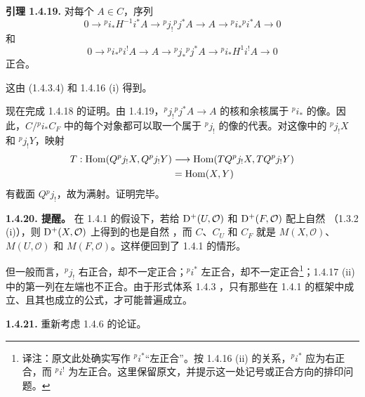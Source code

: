 \par\medskip\noindent\textbf{引理 1.4.19.}
对每个 $A\in C$，序列
\[
0\longrightarrow{}^pi_*H^{-1}i^*A\longrightarrow{}^pj_!{}^pj^*A
 \longrightarrow A\longrightarrow{}^pi_*{}^pi^*A\longrightarrow0
\]
和
\[
0\longrightarrow{}^pi_*{}^pi^!A\longrightarrow A
 \longrightarrow{}^pj_*{}^pj^*A\longrightarrow{}^pi_*H^1i^!A\longrightarrow0
\]
正合。

这由 (1.4.3.4) 和 1.4.16 (i) 得到。

现在完成 1.4.18 的证明。由 1.4.19，${}^pj_!{}^pj^*A\to A$ 的核和余核属于 ${}^pi_*$ 的像。因此，$C/{}^pi_*C_F$ 中的每个对象都可以取一个属于 ${}^pj_!$ 的像的代表。对这像中的 ${}^pj_!X$ 和 ${}^pj_!Y$，映射
\[
\begin{aligned}
T:\operatorname{Hom}(Q{}^pj_!X,Q{}^pj_!Y)&\longrightarrow
\operatorname{Hom}(TQ{}^pj_!X,TQ{}^pj_!Y)\\
&=\operatorname{Hom}(X,Y)
\end{aligned}
\]
有截面 $Q{}^pj_!$，故为满射。证明完毕。

\par\medskip\noindent\textbf{1.4.20. 提醒。}
在 1.4.1 的假设下，若给 $\mathrm{D}^+(U,\mathcal O)$ 和 $\mathrm{D}^+(F,\mathcal O)$ 配上自然 （1.3.2 (i)），则 $\mathrm{D}^+(X,\mathcal O)$ 上得到的也是自然 ，而 $C$、$C_U$ 和 $C_F$ 就是 $M(X,\mathcal O)$、$M(U,\mathcal O)$ 和 $M(F,\mathcal O)$。这样便回到了 1.4.1 的情形。

但一般而言，${}^pj_!$ 右正合，却不一定正合；${}^pi^*$ 左正合，却不一定正合\footnote{译注：原文此处确实写作 ${}^pi^*$“左正合”。按 1.4.16 (ii) 的关系，${}^pi^*$ 应为右正合，而 ${}^pi^!$ 为左正合。这里保留原文，并提示这一处记号或正合方向的排印问题。}；1.4.17 (ii) 中的第一列在左端也不正合。由于形式体系 1.4.3 ，只有那些在 1.4.1 的框架中成立、且其也成立的公式，才可能普遍成立。

\par\medskip\noindent\textbf{1.4.21.}
重新考虑 1.4.6 的论证。


